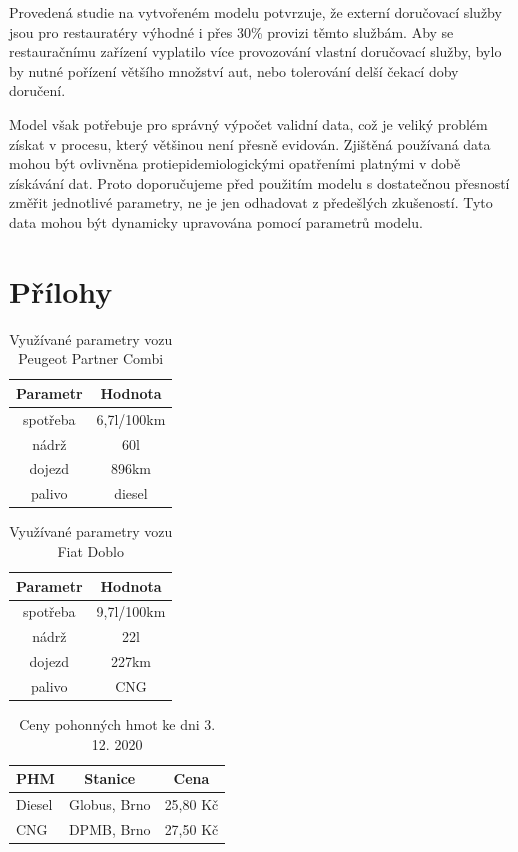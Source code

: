 \documentclass[a4paper, 11pt]{article}
\begin{document}
Provedená studie na vytvořeném modelu potvrzuje, že externí doručovací služby jsou pro restauratéry výhodné i přes 30\% provizi těmto službám. Aby se restauračnímu zařízení vyplatilo více provozování vlastní doručovací služby, bylo by nutné pořízení většího množství aut, nebo tolerování delší čekací doby doručení. 

Model však potřebuje pro správný výpočet validní data, což je veliký problém získat v procesu, který většinou není přesně evidován. Zjištěná používaná data mohou být ovlivněna protiepidemiologickými opatřeními platnými v době získávání dat. Proto doporučujeme před použitím modelu s dostatečnou přesností změřit jednotlivé parametry, ne je jen odhadovat z předešlých zkušeností. Tyto data mohou být dynamicky upravována pomocí parametrů modelu.


\newpage
\section*{Přílohy}
\begin{table}[h]
\centering
\begin{tabular}{cc}
\textbf{Parametr} & \textbf{Hodnota}                                                                                   \\ \hline
spotřeba & 6,7l/100km \\ \hline
nádrž  & 60l \\ \hline                      
dojezd &  896km \\ \hline
palivo & diesel
\end{tabular}
\caption{Využívané parametry vozu Peugeot Partner Combi}
\label{tab:1}
\end{table}

\begin{table}[h]
\centering
\begin{tabular}{cc}
\textbf{Parametr} & \textbf{Hodnota}                                                                                   \\ \hline
spotřeba & 9,7l/100km \\ \hline
nádrž  & 22l \\ \hline
dojezd &  227km \\ \hline
palivo & CNG
\end{tabular}
\caption{Využívané parametry vozu Fiat Doblo}
\label{tab:2}
\end{table}

\begin{table}[h]
\centering
\begin{tabular}{lcc}
\textbf{PHM} & \textbf{Stanice} & \textbf{Cena}                                                                                   \\ \hline
Diesel & Globus, Brno & 25,80 Kč \\ \hline
CNG & DPMB, Brno & 27,50 Kč
\end{tabular}
\caption{Ceny pohonných hmot ke dni 3. 12. 2020}
\label{tab:3}
\end{table}


 

\end{document}
